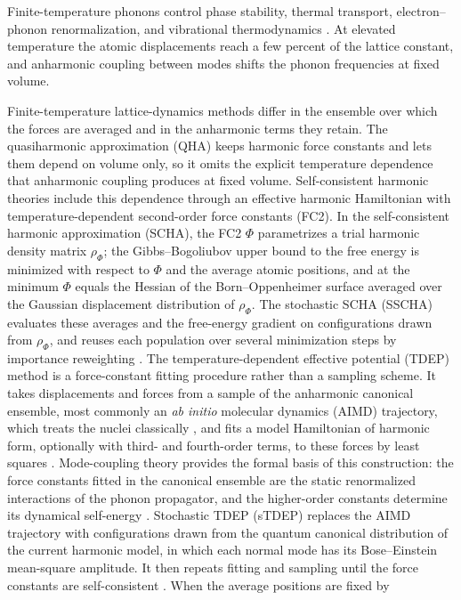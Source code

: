 \documentclass[aip,jap,reprint,amsmath,amssymb,floatfix]{revtex4-2}
\begin{document}
Finite-temperature phonons control phase stability, thermal transport,
electron--phonon renormalization, and vibrational thermodynamics
\cite{ref1,ref2,ref3}. At elevated temperature the atomic displacements reach a
few percent of the lattice constant, and anharmonic coupling between modes
shifts the phonon frequencies at fixed volume.

Finite-temperature lattice-dynamics methods differ in the ensemble over which
the forces are averaged and in the anharmonic terms they retain. The
quasiharmonic approximation (QHA) keeps harmonic force constants and lets them
depend on volume only, so it omits the explicit temperature dependence that
anharmonic coupling produces at fixed volume. Self-consistent harmonic
theories include this dependence through an effective harmonic Hamiltonian
with temperature-dependent second-order force constants (FC2). In the
self-consistent harmonic approximation (SCHA), the FC2 $\Phi$ parametrizes a
trial harmonic density matrix $\rho_\Phi$; the Gibbs--Bogoliubov upper bound
to the free energy is minimized with respect to $\Phi$ and the average atomic
positions, and at the minimum $\Phi$ equals the Hessian of the
Born--Oppenheimer surface averaged over the Gaussian displacement
distribution of $\rho_\Phi$. The stochastic SCHA (SSCHA) evaluates these
averages and the free-energy gradient on configurations drawn from
$\rho_\Phi$, and reuses each population over several minimization steps by
importance reweighting \cite{ref7,ref8,ref50}. The temperature-dependent
effective potential (TDEP) method is a force-constant fitting procedure
rather than a sampling scheme. It takes displacements and forces from a
sample of the anharmonic canonical ensemble, most commonly an \emph{ab
initio} molecular dynamics (AIMD) trajectory, which treats the nuclei
classically \cite{ref9}, and fits a model Hamiltonian of harmonic form,
optionally with third- and fourth-order terms, to these forces by least
squares \cite{ref5,ref6,ref52}. Mode-coupling theory provides the formal basis of
this construction: the force constants fitted in the canonical ensemble are
the static renormalized interactions of the phonon propagator, and the
higher-order constants determine its dynamical self-energy
\cite{ref51}. Stochastic TDEP (sTDEP) replaces the AIMD trajectory with
configurations drawn from the quantum canonical distribution of the current
harmonic model, in which each normal mode has its Bose--Einstein mean-square
amplitude. It then repeats fitting and sampling until the force constants are
self-consistent \cite{ref60}. When the average positions are fixed by
\end{document}
